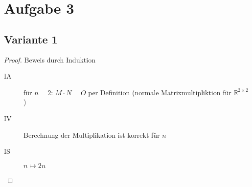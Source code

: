 \documentclass[a4paper]{article}
\begin{document}
    \section*{Aufgabe 3}
    \label{sec:aufgabe3}
    \subsection*{Variante 1}
    \label{subsec:variante1}
    \begin{proof}
        Beweis durch Induktion

        \begin{description}
            \item[IA] für $n = 2$: $M \cdot N = O$ per Definition (normale Matrixmultipliktion für $\mathbb{R}^{2 \times 2}$)
            \item[IV] Berechnung der Multiplikation ist korrekt für $n$
            \item[IS] $n \longmapsto 2n$


\end{description}
\end{proof}
\end{document}
